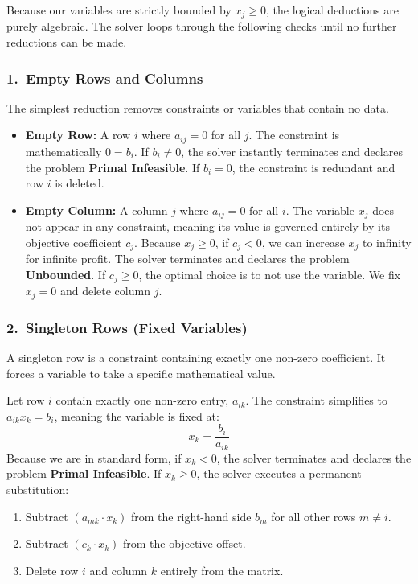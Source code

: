\documentclass[11pt, a4paper]{article}
\begin{document}
Because our variables are strictly bounded by $x_j \ge 0$, the logical deductions are purely algebraic. The solver loops through the following checks until no further reductions can be made.

\subsubsection*{1.\ Empty Rows and Columns}

The simplest reduction removes constraints or variables that contain no data.

\begin{itemize}[itemsep=2pt]
    \item \textbf{Empty Row:} A row $i$ where $a_{ij} = 0$ for all $j$. 
          The constraint is mathematically $0 = b_i$. 
          If $b_i \neq 0$, the solver instantly terminates and declares the problem \textbf{Primal Infeasible}. 
          If $b_i = 0$, the constraint is redundant and row $i$ is deleted.
          
    \item \textbf{Empty Column:} A column $j$ where $a_{ij} = 0$ for all $i$.
          The variable $x_j$ does not appear in any constraint, meaning its value is governed entirely by its objective coefficient $c_j$.
          Because $x_j \ge 0$, if $c_j < 0$, we can increase $x_j$ to infinity for infinite profit. The solver terminates and declares the problem \textbf{Unbounded}. 
          If $c_j \ge 0$, the optimal choice is to not use the variable. We fix $x_j = 0$ and delete column $j$.
\end{itemize}

\subsubsection*{2.\ Singleton Rows (Fixed Variables)}

A singleton row is a constraint containing exactly one non-zero coefficient. It forces a variable to take a specific mathematical value.

\begin{definition}
Let row $i$ contain exactly one non-zero entry, $a_{ik}$. The constraint simplifies to $a_{ik} x_k = b_i$, meaning the variable is fixed at:
\[
x_k = \frac{b_i}{a_{ik}}
\]
Because we are in standard form, if $x_k < 0$, the solver terminates and declares the problem \textbf{Primal Infeasible}. 
If $x_k \ge 0$, the solver executes a permanent substitution:
\begin{enumerate}[label=\textbf{\arabic*.}, leftmargin=*, itemsep=2pt]
    \item Subtract $(a_{mk} \cdot x_k)$ from the right-hand side $b_m$ for all other rows $m \neq i$.
    \item Subtract $(c_k \cdot x_k)$ from the objective offset.
    \item Delete row $i$ and column $k$ entirely from the matrix.
\end{enumerate}
\end{definition}
\end{document}
